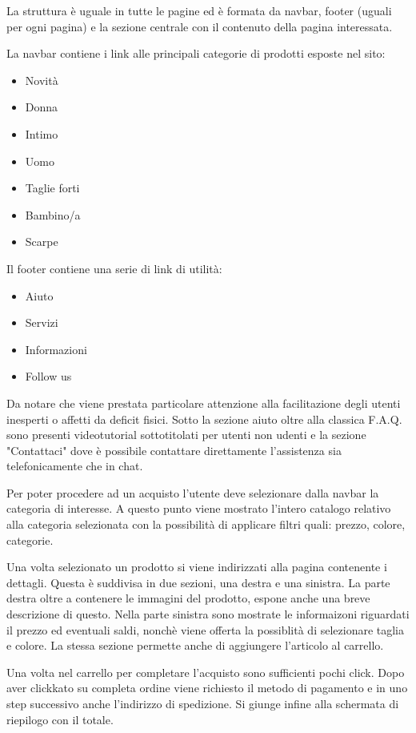 \documentclass[12pt,italian,]{report}
\begin{document}
La struttura è uguale in tutte le pagine ed è formata da navbar, footer (uguali per ogni pagina) e la sezione centrale con il contenuto della pagina interessata.

La navbar contiene i link alle principali categorie di prodotti esposte nel sito:

\begin{itemize}
\item Novità
\item Donna
\item Intimo
\item Uomo
\item Taglie forti
\item Bambino/a
\item Scarpe
\end{itemize}

Il footer contiene una serie di link di utilità:

\begin{itemize}
\item Aiuto
\item Servizi
\item Informazioni
\item Follow us
\end{itemize}

Da notare che viene prestata particolare attenzione alla facilitazione degli utenti inesperti o affetti da deficit fisici. Sotto la sezione aiuto oltre alla classica F.A.Q. sono presenti videotutorial sottotitolati per utenti non udenti e la sezione "Contattaci" dove è possibile contattare direttamente l'assistenza sia telefonicamente che in chat.

Per poter procedere ad un acquisto l'utente deve selezionare dalla navbar la categoria di interesse.
A questo punto viene mostrato l'intero catalogo relativo alla categoria selezionata con la possibilità di applicare filtri quali: prezzo, colore, categorie.

Una volta selezionato un prodotto si viene indirizzati alla pagina contenente i dettagli. Questa è suddivisa in due sezioni, una destra e una sinistra.
La parte destra oltre a contenere le immagini del prodotto, espone anche una breve descrizione di questo. 
Nella parte sinistra sono mostrate le informaizoni riguardati il prezzo ed eventuali saldi, nonchè viene offerta la possiblità di selezionare taglia e colore. La stessa sezione permette anche di aggiungere l'articolo al carrello.

Una volta nel carrello per completare l'acquisto sono sufficienti pochi click. Dopo aver clickkato su completa ordine viene richiesto il metodo di pagamento e in uno step successivo anche l'indirizzo di spedizione. Si giunge infine alla schermata di riepilogo con il totale.
\end{document}
